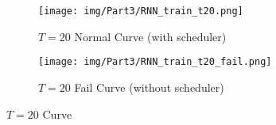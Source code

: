 \begin{appendix}
  \begin{figure}[!htbp]
    \centering
    \begin{subfigure}[b]{1\textwidth}
      \texttt{[image: img/Part3/RNN\_train\_t20.png]}
      \caption{$T=20$ Normal Curve (with scheduler)}
    \end{subfigure}
    \begin{subfigure}[b]{1\textwidth}
      \texttt{[image: img/Part3/RNN\_train\_t20\_fail.png]}
      \caption{$T=20$ Fail Curve (without scheduler)}
    \end{subfigure}
    \caption{$T=20$ Curve}
    \label{fig:p3_t=20}
  \end{figure}

\end{appendix}
